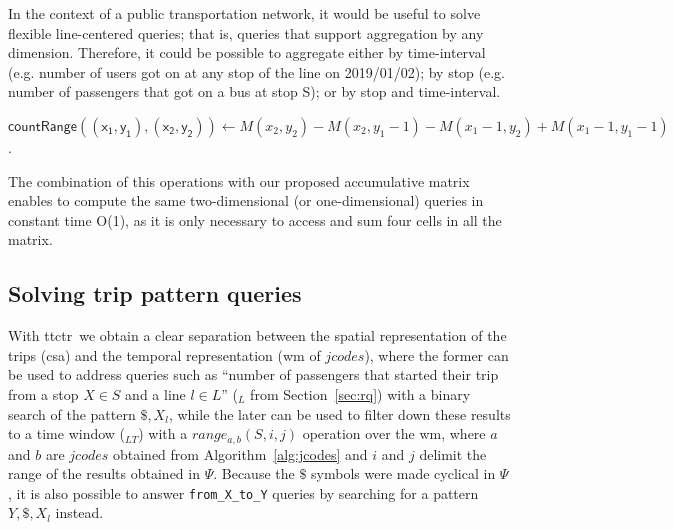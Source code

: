     In the context of a public transportation network, it would be useful to solve flexible line-centered queries; that is, queries that support aggregation by any dimension. Therefore, it could be possible to aggregate either by time-interval (e.g. number of users got on at any stop of the line on 2019/01/02); by stop (e.g. number of passengers that got on a bus at stop S); or by stop and time-interval.
    
    $\mathsf{countRange((x_1,y_1),(x_2,y_2))} \leftarrow {M(x_2,y_2)} - {M(x_2,y_1-1)} - {M(x_1-1,y_2)} + {M(x_1-1,y_1-1)}$.
    
    The combination of this operations with our proposed accumulative matrix enables to compute the same two-dimensional (or one-dimensional) queries in constant time O(1), as it is only necessary to access and sum four cells in all the matrix.
	
	\subsection{Solving trip pattern queries}
	With \gls{ttctr}~we obtain a clear separation between the spatial representation of the trips (\gls{csa}) and the temporal representation (\gls{wm} of $jcodes$), where the former can be used to address queries such as ``number of passengers that started their trip from a stop $X\in S$ and a line $l\in L$'' (\texttt{\startX$_{L}$} from Section~\ref{sec:rq}) with a binary search of the pattern $\$,X_l$, while the later can be used to filter down these results to a time window (\texttt{\startX$_{LT}$}) with a $range_{a,b}(S,i,j)$ operation over the \gls{wm}, where $a$ and $b$ are $jcodes$ obtained from Algorithm~\ref{alg:jcodes} and $i$ and $j$ delimit the range of the results obtained in $\Psi$. Because the $\$$ symbols were made cyclical in $\Psi$, it is also possible to answer \texttt{from\_X\_to\_Y} queries by searching for a pattern $Y,\$,X_l$ instead.
	
